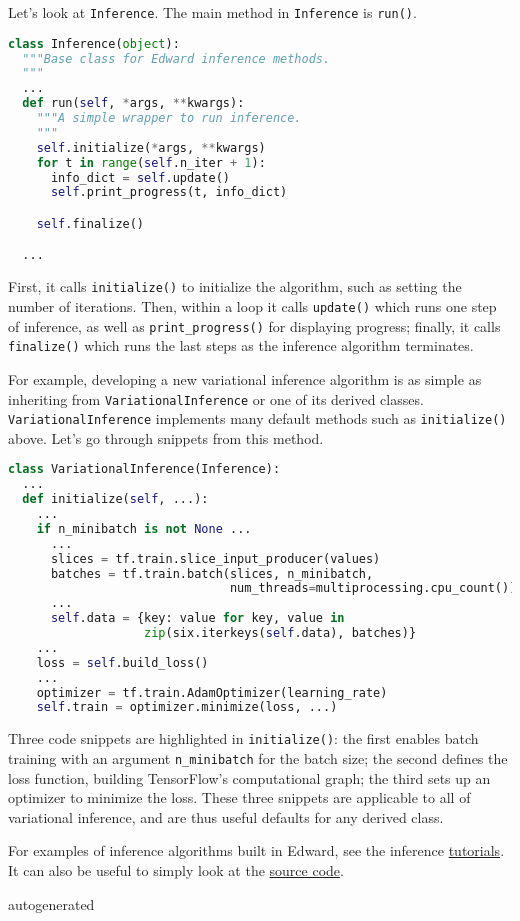 Let's look at \texttt{Inference}. The main method in
\texttt{Inference} is \texttt{run()}.

\begin{lstlisting}[language=Python]
class Inference(object):
  """Base class for Edward inference methods.
  """
  ...
  def run(self, *args, **kwargs):
    """A simple wrapper to run inference.
    """
    self.initialize(*args, **kwargs)
    for t in range(self.n_iter + 1):
      info_dict = self.update()
      self.print_progress(t, info_dict)

    self.finalize()

  ...
\end{lstlisting}

First, it calls \texttt{initialize()} to initialize the algorithm, such as
setting the number of iterations. Then, within a loop it calls
\texttt{update()} which runs one step of inference, as well as
\texttt{print_progress()} for displaying progress; finally, it
calls \texttt{finalize()} which runs the last steps as the inference
algorithm terminates.

For example, developing a new variational inference algorithm is as simple as
inheriting from \texttt{VariationalInference} or one of its derived
classes. \texttt{VariationalInference} implements many default methods such
as \texttt{initialize()} above. Let's go through snippets from this method.

\begin{lstlisting}[language=Python]
class VariationalInference(Inference):
  ...
  def initialize(self, ...):
    ...
    if n_minibatch is not None ...
      ...
      slices = tf.train.slice_input_producer(values)
      batches = tf.train.batch(slices, n_minibatch,
                               num_threads=multiprocessing.cpu_count())
      ...
      self.data = {key: value for key, value in
                   zip(six.iterkeys(self.data), batches)}
    ...
    loss = self.build_loss()
    ...
    optimizer = tf.train.AdamOptimizer(learning_rate)
    self.train = optimizer.minimize(loss, ...)
\end{lstlisting}

Three code snippets are highlighted in \texttt{initialize()}: the first
enables batch training with an argument \texttt{n_minibatch} for the batch
size; the second defines the loss function, building TensorFlow's
computational graph; the third sets up an optimizer to minimize the
loss. These three snippets are applicable to all of variational
inference, and are thus useful defaults for any derived class.

For examples of inference algorithms built in Edward, see the inference
\href{/tutorials/}{tutorials}. It can also be useful to simply look at
the
\href{https://github.com/blei-lab/edward/tree/master/edward/inferences}
{source code}.

{{autogenerated}}
